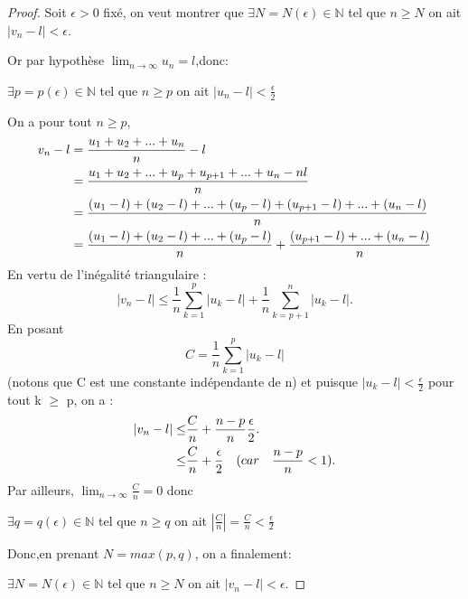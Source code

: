 \documentclass[12pt]{book}
\theoremstyle{definition}\newtheorem{dfn}{Définition}[chapter]
\theoremstyle{plain}\newtheorem{thm}{Théorème}[chapter]
\theoremstyle{plain}\newtheorem{prp}{Proposition}[chapter]
\theoremstyle{plain}\newtheorem{lem}{\bf Lemme}[chapter]
\theoremstyle{plain}\newtheorem{axm}{\bf Axiome}[chapter]
\theoremstyle{plain}\newtheorem{lmm}{\bf Lemme}[chapter]
\theoremstyle{plain}\newtheorem{cor}{\bf Corollaire}[chapter]
\theoremstyle{remark}\newtheorem{rem}{Remarque}[chapter]
\begin{document}
\begin{proof}
        Soit $\epsilon > 0$ fixé, on veut montrer que $ \exists N=N(\epsilon) \in \mathbb{N} $ tel que $n\ge N$ on ait $|v_n-l| < \epsilon$.

        Or par hypothèse $\lim_{n \rightarrow \infty} u_n = l $,donc:

        $ \exists p=p(\epsilon) \in \mathbb{N} $ tel que $n\ge p$ on ait $|u_n-l| < \frac{\epsilon}{2}$

        On a pour tout $n\ge p$,
        \begin{align}
        v_n-l ={} & \frac{u_1+u_2+...+u_n}{n}-l \notag \\
        ={} & \frac{u_1+u_2+...+u_p+u_{p+1}+...+u_n-nl}{n} \notag \\
        ={} & \frac{(u_1-l)+(u_2-l)+...+(u_p-l)+(u_{p+1}-l)+...+(u_n-l)}{n}  \notag \\
        ={} & \frac{(u_1-l)+(u_2-l)+...+(u_p-l)}{n}+\frac{(u_{p+1}-l)+...+(u_n-l)}{n}  \notag
        \end{align}
        En vertu de l'inégalité triangulaire :
        $$|v_n-l| \le \frac{1}{n}\sum_{k=1}^{p}|u_k-l| + \frac{1}{n}\sum_{k=p+1}^{n}|u_k-l|.
        $$
        En posant
        $$C=\frac{1}{n}\sum_{k=1}^{p}|u_k-l|$$
        (notons que C est une constante indépendante de n) et puisque $|u_k-l|< \frac{\epsilon}{2}$
        pour tout k $\ge$ p, on a :
        \begin{align}
        |v_n-l| \le & \frac{C}{n} + \frac{n-p}{n}\frac{\epsilon}{2}. \notag \\
              \le & \frac{C}{n} + \frac{\epsilon}{2}\quad(car\quad \frac{n-p}{n} < 1). \notag
        \end{align}
        Par ailleurs, $\lim_{n\rightarrow \infty}\frac{C}{n}=0$ donc

$ \exists q=q(\epsilon) \in \mathbb{N} $ tel que $n\ge q$ on ait $|\frac{C}{n}|=\frac{C}{n} < \frac{\epsilon}{2}$

Donc,en prenant $N=max(p,q)$, on a finalement:

$ \exists N=N(\epsilon) \in \mathbb{N} $ tel que $n\ge N$ on ait $|v_n-l| < \epsilon$.

\end{proof}

\end{document}
